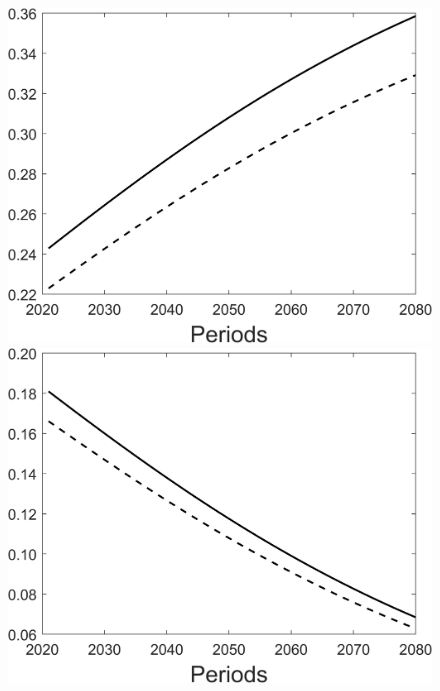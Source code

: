 \begin{figure}[h!!]
\begin{minipage}[]{0.32\textwidth}
	\end{minipage}
	\begin{minipage}[]{0.32\textwidth}
		\includegraphics[width=1\textwidth]{../../codding_model/Own/figures/Rep_agent/staticBAU_LF_separate_Lc_periods59_eppsilon0.40_zeta1.40_Ad08_Ac04_thetac0.70_thetad0.56_HetGrowth1_tauul0.181_util0_withtarget0_lgd0.png}
	\end{minipage}
	\begin{minipage}[]{0.32\textwidth}
		\includegraphics[width=1\textwidth]{../../codding_model/Own/figures/Rep_agent/staticBAU_LF_separate_Ld_periods59_eppsilon0.40_zeta1.40_Ad08_Ac04_thetac0.70_thetad0.56_HetGrowth1_tauul0.181_util0_withtarget0_lgd0.png}

\end{minipage}
\end{figure}
